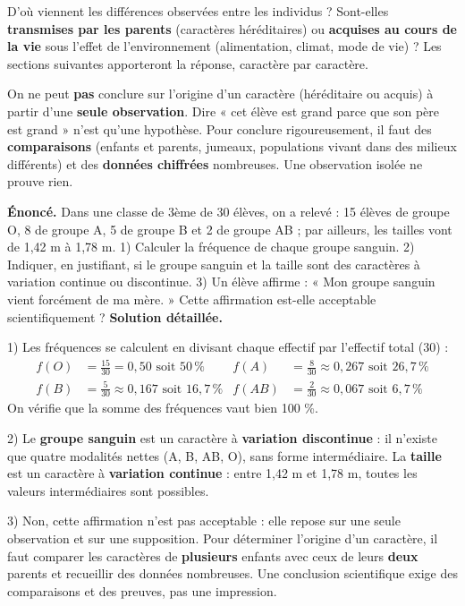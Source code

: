 \documentclass[11pt]{article}
\begin{document}
\begin{aretenir}
D'où viennent les différences observées entre les individus ? Sont-elles \textbf{transmises par les parents} (caractères héréditaires) ou \textbf{acquises au cours de la vie} sous l'effet de l'environnement (alimentation, climat, mode de vie) ? Les sections suivantes apporteront la réponse, caractère par caractère.
\end{aretenir}

\begin{attention}
On ne peut \textbf{pas} conclure sur l'origine d'un caractère (héréditaire ou acquis) à partir d'une \textbf{seule observation}. Dire « cet élève est grand parce que son père est grand » n'est qu'une hypothèse. Pour conclure rigoureusement, il faut des \textbf{comparaisons} (enfants et parents, jumeaux, populations vivant dans des milieux différents) et des \textbf{données chiffrées} nombreuses. Une observation isolée ne prouve rien.
\end{attention}

\begin{exoresolu}
\textbf{Énoncé.} Dans une classe de 3ème de 30 élèves, on a relevé : 15 élèves de groupe O, 8 de groupe A, 5 de groupe B et 2 de groupe AB ; par ailleurs, les tailles vont de 1,42 m à 1,78 m. 1) Calculer la fréquence de chaque groupe sanguin. 2) Indiquer, en justifiant, si le groupe sanguin et la taille sont des caractères à variation continue ou discontinue. 3) Un élève affirme : « Mon groupe sanguin vient forcément de ma mère. » Cette affirmation est-elle acceptable scientifiquement ?
\tcblower
\textbf{Solution détaillée.}\par
1) Les fréquences se calculent en divisant chaque effectif par l'effectif total (30) :
\begin{align*}
f(O) &= \frac{15}{30} = 0,50 \text{ soit } 50\,\% &
f(A) &= \frac{8}{30} \approx 0,267 \text{ soit } 26,7\,\% \\
f(B) &= \frac{5}{30} \approx 0,167 \text{ soit } 16,7\,\% &
f(AB) &= \frac{2}{30} \approx 0,067 \text{ soit } 6,7\,\%
\end{align*}
On vérifie que la somme des fréquences vaut bien 100 \%.\par
2) Le \textbf{groupe sanguin} est un caractère à \textbf{variation discontinue} : il n'existe que quatre modalités nettes (A, B, AB, O), sans forme intermédiaire. La \textbf{taille} est un caractère à \textbf{variation continue} : entre 1,42 m et 1,78 m, toutes les valeurs intermédiaires sont possibles.\par
3) Non, cette affirmation n'est pas acceptable : elle repose sur une seule observation et sur une supposition. Pour déterminer l'origine d'un caractère, il faut comparer les caractères de \textbf{plusieurs} enfants avec ceux de leurs \textbf{deux} parents et recueillir des données nombreuses. Une conclusion scientifique exige des comparaisons et des preuves, pas une impression.
\end{exoresolu}
\end{document}
